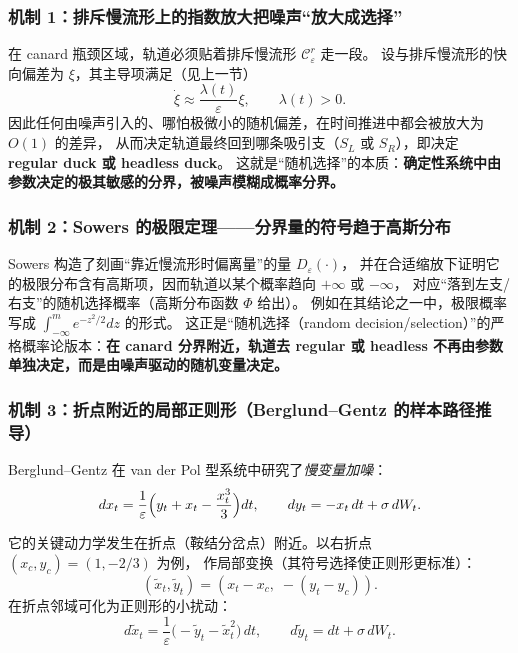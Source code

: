 	\subsubsection{机制 1：排斥慢流形上的指数放大把噪声“放大成选择”}
	在 canard 瓶颈区域，轨道必须贴着排斥慢流形 $\mathcal C_\varepsilon^{r}$ 走一段。
	设与排斥慢流形的快向偏差为 $\xi$，其主导项满足（见上一节）
	\[
	\dot \xi \approx \frac{\lambda(t)}{\varepsilon}\xi,\qquad \lambda(t)>0.
	\]
	因此任何由噪声引入的、哪怕极微小的随机偏差，在时间推进中都会被放大为 $O(1)$ 的差异，
	从而决定轨道最终回到哪条吸引支（$S_L$ 或 $S_R$），即决定 \textbf{regular duck 或 headless duck}。
	这就是“随机选择”的本质：\textbf{确定性系统中由参数决定的极其敏感的分界，被噪声模糊成概率分界。}
	
	\subsubsection{机制 2：Sowers 的极限定理——分界量的符号趋于高斯分布}
	Sowers 构造了刻画“靠近慢流形时偏离量”的量 $D_\varepsilon(\cdot)$，
	并在合适缩放下证明它的极限分布含有高斯项，因而轨道以某个概率趋向 $+\infty$ 或 $-\infty$，
	对应“落到左支/右支”的随机选择概率（高斯分布函数 $\Phi$ 给出）。
	例如在其结论之一中，极限概率写成 $\int_{-\infty}^{m} e^{-z^2/2}dz$ 的形式。%
	这正是“随机选择（random decision/selection）”的严格概率论版本：\textbf{在 canard 分界附近，轨道去 regular 或 headless 不再由参数单独决定，而是由噪声驱动的随机变量决定。}
	
	\subsubsection{机制 3：折点附近的局部正则形（Berglund--Gentz 的样本路径推导）}
	Berglund--Gentz 在 van der Pol 型系统中研究了\emph{慢变量加噪}：
	\begin{equation}\label{eq:BG-619}
		dx_t=\frac{1}{\varepsilon}\Bigl(y_t+x_t-\frac{x_t^3}{3}\Bigr)dt,\qquad
		dy_t=-x_t\,dt+\sigma\,dW_t .
	\end{equation}
	
	它的关键动力学发生在折点（鞍结分岔点）附近。以右折点 $(x_c,y_c)=(1,-2/3)$ 为例，
	作局部变换（其符号选择使正则形更标准）：
	\[
	(\tilde x_t,\tilde y_t)=(x_t-x_c,\; -(y_t-y_c)).
	\]
	在折点邻域可化为正则形的小扰动：
	\begin{equation}\label{eq:BG-620}
		d\tilde x_t=\frac{1}{\varepsilon}\bigl(-\tilde y_t-\tilde x_t^2\bigr)\,dt,\qquad
		d\tilde y_t=dt+\sigma\,dW_t .
	\end{equation}
	
